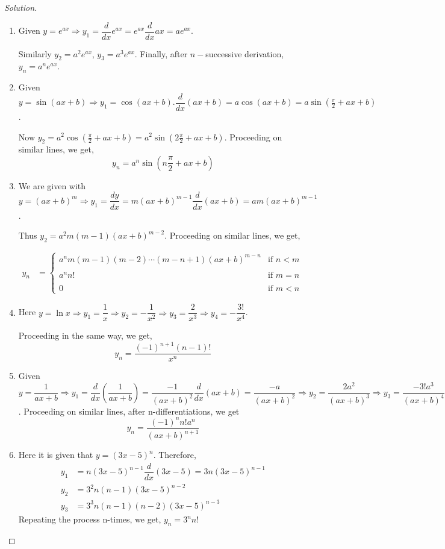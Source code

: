 \documentclass[../../main.tex]{subfiles}
\theoremstyle{definition}
\newenvironment{solution}
    {\begin{proof}[Solution]}
    {\end{proof}}
\begin{document}
\begin{solution}
\begin{enumerate}[label=(\roman*)]
\item Given $y=e^{ax}\Rightarrow y_1 =\dfrac{d}{dx}e^{ax}=e^{ax}\dfrac{d}{dx}ax=ae^{ax}$. 

Similarly $y_2=a^2e^{ax}$, $y_3=a^3e^{ax}$. Finally, after $n-$successive derivation, $y_n=a^ne^{ax}$.

\item Given $y=\sin (ax+b)\Rightarrow y_1= \cos(ax+b).\dfrac{d}{dx}(ax+b)=a\cos(ax+b)=a\sin(\frac{\pi}{2}+ax+b)$.

Now $y_2=a^2\cos(\frac{\pi}{2}+ax+b)=a^2\sin(2\frac{\pi}{2}+ax+b)$. Proceeding on similar lines, we get,
\[
    y_n=a^n\sin(n\frac{\pi}{2}+ax+b)
\]

\item We are given with $y=(ax+b)^m \Rightarrow y_1=\dfrac{dy}{dx}=m(ax+b)^{m-1}\dfrac{d}{dx}(ax+b)=am(ax+b)^{m-1}$. 

Thus $y_2 =a^2m(m-1)(ax+b)^{m-2}$. Proceeding on similar lines, we get,

\begin{align*}
y_n &= 
\begin{cases}
a^nm(m-1)(m-2)\cdots(m-n+1)(ax+b)^{m-n}     & \text{if   }n<m \\\\    
a^n n!    & \text{if   }   m=n  \\\\
0  & \text{if   }   m < n
\end{cases}&    
\end{align*}

\item Here $y=\ln x \Rightarrow y_1= \dfrac{1}{x} \Rightarrow y_2=-\dfrac{1}{x^2} \Rightarrow y_3=\dfrac{2}{x^3} \Rightarrow y_4=-\dfrac{3!}{x^4}$. 

Proceeding in the same way, we get, 
\[
y_n=\dfrac{(-1)^{n+1}(n-1)!}{x^n}
\]

\item Given $y=\dfrac{1}{ax+b} \Rightarrow y_1= \dfrac{d}{dx}(\dfrac{1}{ax+b})=\dfrac{-1}{(ax+b)^2}\dfrac{d}{dx}(ax+b)=\dfrac{-a}{(ax+b)^2} \Rightarrow y_2=\dfrac{2a^2}{(ax+b)^3} \Rightarrow y_3=\dfrac{-3!a^3}{(ax+b)^4}$. Proceeding on similar lines, after n-differentiations, we get 
\[
y_n= \dfrac{(-1)^n n! a^n}{(ax+b)^{n+1}}
\]

\item Here it is given that $y=(3x-5)^n$. Therefore, 
\begin{align*}
    y_1&=n(3x-5)^{n-1}\dfrac{d}{dx}(3x-5)=3n(3x-5)^{n-1} \\
    y_2&=3^2n(n-1)(3x-5)^{n-2} \\
    y_3&=3^3n(n-1)(n-2)(3x-5)^{n-3}
\end{align*}
Repeating the process n-times, we get, $y_n=3^n n!$


\end{enumerate}
\end{solution}
\end{document}
